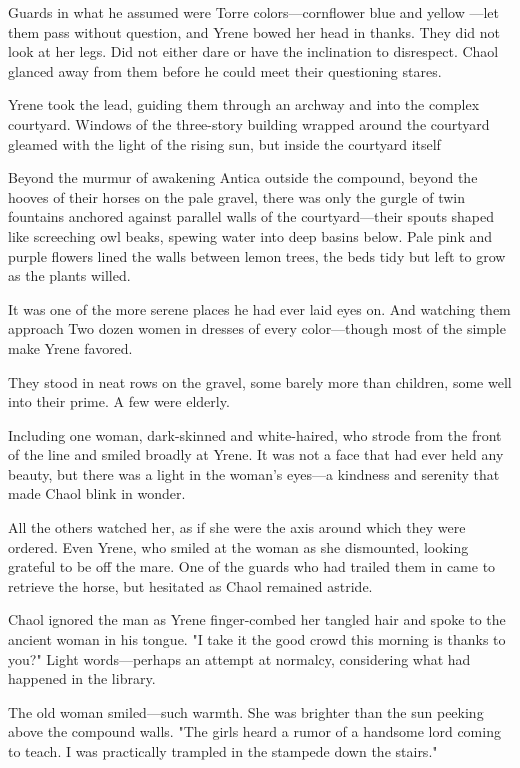 Guards in what he assumed were Torre colors---cornflower blue and yellow ---let them pass without question, and Yrene bowed her head in thanks. They did not look at her legs. Did not either dare or have the inclination to disrespect. Chaol glanced away from them before he could meet their questioning stares.

Yrene took the lead, guiding them through an archway and into the complex courtyard. Windows of the three-story building wrapped around the courtyard gleamed with the light of the rising sun, but inside the courtyard itself 

Beyond the murmur of awakening Antica outside the compound, beyond the hooves of their horses on the pale gravel, there was only the gurgle of twin fountains anchored against parallel walls of the courtyard---their spouts shaped like screeching owl beaks, spewing water into deep basins below. Pale pink and purple flowers lined the walls between lemon trees, the beds tidy but left to grow as the plants willed.

It was one of the more serene places he had ever laid eyes on. And watching them approach  Two dozen women in dresses of every color---though most of the simple make Yrene favored.

They stood in neat rows on the gravel, some barely more than children, some well into their prime. A few were elderly.

Including one woman, dark-skinned and white-haired, who strode from the front of the line and smiled broadly at Yrene. It was not a face that had ever held any beauty, but there was a light in the woman's eyes---a kindness and serenity that made Chaol blink in wonder.

All the others watched her, as if she were the axis around which they were ordered. Even Yrene, who smiled at the woman as she dismounted, looking grateful to be off the mare. One of the guards who had trailed them in came to retrieve the horse, but hesitated as Chaol remained astride.

Chaol ignored the man as Yrene finger-combed her tangled hair and spoke to the ancient woman in his tongue. "I take it the good crowd this morning is thanks to you?" Light words---perhaps an attempt at normalcy, considering what had happened in the library.

The old woman smiled---such warmth. She was brighter than the sun peeking above the compound walls. "The girls heard a rumor of a handsome lord coming to teach. I was practically trampled in the stampede down the stairs."

